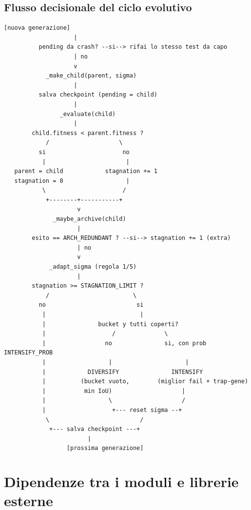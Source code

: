 \documentclass[11pt,a4paper]{report}
\begin{document}
\section{Flusso decisionale del ciclo evolutivo}
\begin{lstlisting}[style=ascii]
             [nuova generazione]
                    |
          pending da crash? --si--> rifai lo stesso test da capo
                    | no
                    v
            _make_child(parent, sigma)
                    |
          salva checkpoint (pending = child)
                    |
                _evaluate(child)
                    |
        child.fitness < parent.fitness ?
            /                    \
          si                      no
           |                       |
   parent = child            stagnation += 1
   stagnation = 0                  |
           \                      /
            +--------+-----------+
                     v
              _maybe_archive(child)
                     |
        esito == ARCH_REDUNDANT ? --si--> stagnation += 1 (extra)
                     | no
                     v
             _adapt_sigma (regola 1/5)
                     |
        stagnation >= STAGNATION_LIMIT ?
            /                        \
          no                          si
           |                           |
           |               bucket y tutti coperti?
           |                   /              \
           |                 no               si, con prob INTENSIFY_PROB
           |                  |                     |
           |            DIVERSIFY               INTENSIFY
           |          (bucket vuoto,        (miglior fail + trap-gene)
           |           min IoU)                    |
           |                  \                    /
           |                   +--- reset sigma --+
            \                          /
             +--- salva checkpoint ---+
                        |
                  [prossima generazione]
\end{lstlisting}

\chapter{Dipendenze tra i moduli e librerie esterne}
\end{document}
